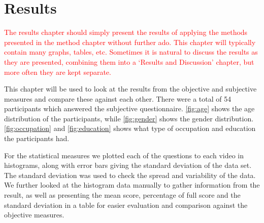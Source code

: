 \chapter{Results}\label{cha:results}
%
\textcolor{red}{The results chapter should simply present the results of applying the methods presented in the method chapter without further ado. This chapter will typically contain many graphs, tables, etc. Sometimes it is natural to discuss the results as they are presented, combining them into a `Results and Discussion' chapter, but more often they are kept separate.}

This chapter will be used to look at the results from the objective and subjective measures and compare these against each other. There were a total of 54 participants which answered the subjective questionnaire. \autoref{fig:age} shows the age distribution of the participants, while \autoref{fig:gender} shows the gender distribution. \autoref{fig:occupation} and \autoref{fig:education} shows what type of occupation and education the participants had. 

For the statistical measures we plotted each of the questions to each video in histograms, along with error bars giving the standard deviation of the data set. The standard deviation was used to check the spread and variability of the data. We further looked at the histogram data manually to gather information from the result, as well as presenting the mean score, percentage of full score and the standard deviation in a table for easier evaluation and comparison against the objective measures.

